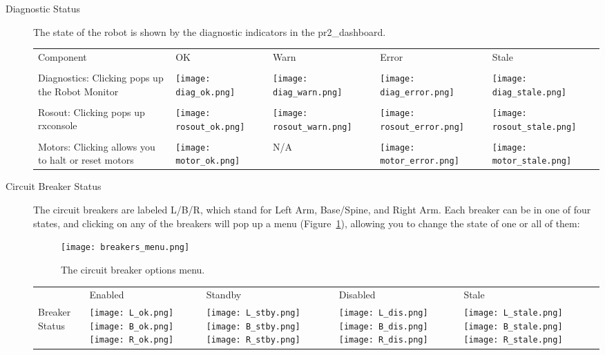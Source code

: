 \begin{description}
\item[Diagnostic Status] The state of the robot is shown by the diagnostic indicators in the pr2\_dashboard. \\

    \begin{tabular}{m{6cm}SSSS}
    Component & OK & Warn & Error & Stale\\
    &&&&\\
    Diagnostics: Clicking pops up the Robot Monitor & \texttt{[image: diag\_ok.png]}&\texttt{[image: diag\_warn.png]}&
                                                      \texttt{[image: diag\_error.png]}&\texttt{[image: diag\_stale.png]}\\
    &&&&\\
    Rosout: Clicking pops up rxconsole & \texttt{[image: rosout\_ok.png]}&\texttt{[image: rosout\_warn.png]}&
                                        \texttt{[image: rosout\_error.png]}&\texttt{[image: rosout\_stale.png]}\\
    &&&&\\
    Motors: Clicking allows you to halt or reset motors & \texttt{[image: motor\_ok.png]}& N/A &
                                                          \texttt{[image: motor\_error.png]}&\texttt{[image: motor\_stale.png]}\\
   \end{tabular}

\item[Circuit Breaker Status] The circuit breakers are labeled L/B/R, which stand for Left Arm, Base/Spine, and Right Arm. 
Each breaker can be in one of four states, and clicking on any of the breakers will pop up a menu (Figure~\ref{fig:breaker_menu}), allowing you to change the state of one or all of them:
\begin{figure}[h]
\centering
\texttt{[image: breakers\_menu.png]}
\caption{The circuit breaker options menu.}
\label{fig:breaker_menu}
\end{figure}

    \begin{tabular}{m{2.6cm}SSSS}
     & Enabled & Standby & Disabled & Stale\\
    Breaker Status & \texttt{[image: L\_ok.png]}\texttt{[image: B\_ok.png]}\texttt{[image: R\_ok.png]}&
                     \texttt{[image: L\_stby.png]}\texttt{[image: B\_stby.png]}\texttt{[image: R\_stby.png]}&
                     \texttt{[image: L\_dis.png]}\texttt{[image: B\_dis.png]}\texttt{[image: R\_dis.png]}&
                     \texttt{[image: L\_stale.png]}\texttt{[image: B\_stale.png]}\texttt{[image: R\_stale.png]}\\
   \end{tabular}


\end{description}
